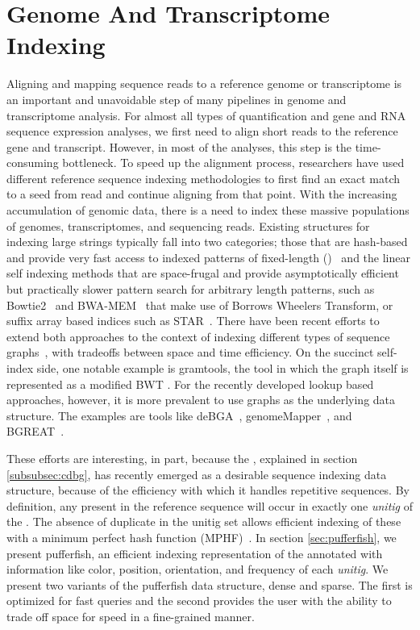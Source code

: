 \section{Genome And Transcriptome Indexing}
\label{subsec:indexing}
Aligning and mapping sequence reads to a reference genome or transcriptome is an important and unavoidable step of many pipelines in genome and transcriptome analysis. For almost all types of quantification and gene and RNA sequence expression analyses, we first need to align short reads to the reference gene and transcript. However, in most of the analyses, this step is the time-consuming bottleneck. To speed up the alignment process, researchers have used different reference sequence indexing methodologies to first find an exact match to a seed from read and continue aligning from that point. With the increasing accumulation of genomic data, there is a need to index these massive populations of genomes, transcriptomes, and sequencing reads. Existing structures for indexing large strings typically fall into two categories; those that are hash-based and provide very fast access to indexed patterns of fixed-length (\kmers)~\cite{liao2013subread} and the linear self indexing methods that are space-frugal and provide asymptotically efficient but practically slower pattern search for arbitrary length patterns, such as Bowtie2~\cite{langmead2012fast} and BWA-MEM~\cite{li2013aligning} that make use of Borrows Wheelers Transform, or suffix array based indices such as STAR~\cite{dobin2013star}. There have been recent efforts to extend both approaches to the context of indexing different types of sequence graphs~\cite{paten2017genome}, with tradeoffs between space and time efficiency. On the succinct self-index side, one notable example is gramtools, the tool in which the graph itself is represented as a modified BWT \cite{maciuca2016natural}. For the recently developed \kmer lookup based approaches, however, it is more prevalent to use graphs as the underlying data structure. The examples are tools like deBGA~\cite{liu2016debga}, genomeMapper~\cite{schneeberger2009simultaneous}, and BGREAT~\cite{limasset2016read}. 

These efforts are interesting, in part, because the \ccdbg, explained in section \ref{subsubsec:cdbg}, has recently emerged as a desirable sequence indexing data structure, because of the efficiency with which it handles repetitive sequences. By definition, any \kmer present in the reference sequence will occur in exactly one \emph{unitig} of the \ccdbg. The absence of duplicate \kmers in the unitig set allows efficient indexing of these \kmers with a minimum perfect hash function (MPHF)~\cite{limasset2017fast}. In section \ref{sec:pufferfish}, we present pufferfish, an efficient indexing representation of the \ccdbg annotated with information like color, position, orientation, and frequency of each \emph{unitig}. We present two variants of the pufferfish data structure, dense and sparse. The first is optimized for fast queries and the second provides the user with the ability to trade off space for speed in a fine-grained manner.
